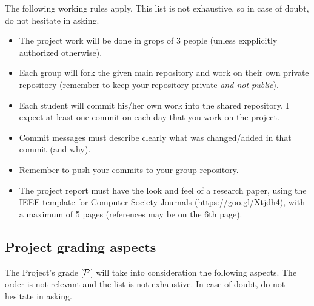 \documentclass[11pt]{article}
\begin{document}
The following working rules apply.  This list is not exhaustive, so in case of doubt, do not hesitate in asking.
\begin{itemize}
  \item The project work will be done in grops of 3 people (unless expplicitly authorized otherwise).
  \item Each group will fork the given main repository and work on their own private repository (remember to keep your repository private \emph{and not public}).
  \item Each student will commit his/her own work into the shared repository.  I expect at least one commit on each day that you work on the project.
  \item Commit messages must describe clearly what was changed/added in that commit (and why).
  \item Remember to push your commits to your group repository. 
  \item The project report must have the look and feel of a research paper, using the IEEE template for Computer Society Journals (\url{https://goo.gl/Xtjdh4}), with a maximum of 5 pages (references may be on the 6th page).
\end{itemize}

\subsection{Project grading aspects}

The Project's grade [$\cal{P}$] will take into consideration the following aspects.  The order is not relevant and the list is not exhaustive. In case of doubt, do not hesitate in asking.
\end{document}
